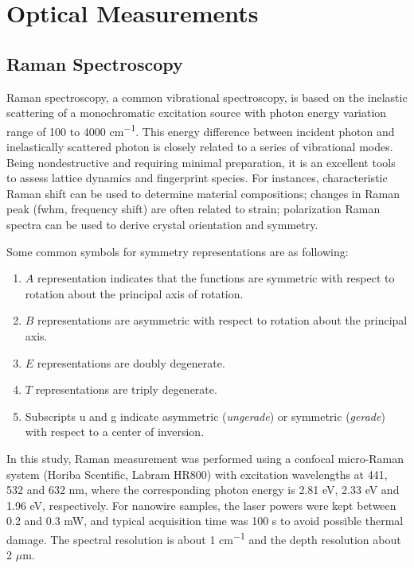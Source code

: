 \section{Optical Measurements}
\subsection{Raman Spectroscopy}

Raman spectroscopy, a common vibrational spectroscopy, is based on the inelastic scattering of a monochromatic excitation source with photon energy variation range of 100 to 4000 \si{cm^{-1}}. This energy difference between incident photon and inelastically scattered photon is closely related to a series of vibrational modes. Being nondestructive and requiring minimal preparation, it is an excellent tools to assess lattice dynamics and fingerprint species.\cite{McCreery2000} For instances, characteristic Raman shift can be used to determine material compositions; changes in Raman peak (\gls{fwhm}, frequency shift) are often related to strain; polarization Raman spectra can be used to derive crystal orientation and symmetry. 

Some common symbols for symmetry representations are as following:
\begin{enumerate}
\item $A$ representation indicates that the functions are symmetric with respect to rotation about the principal axis of rotation.
\item $B$ representations are asymmetric with respect to rotation about the principal axis.
\item $E$ representations are doubly degenerate.
\item $T$ representations are triply degenerate.
\item Subscripts u and g indicate asymmetric (\emph{ungerade}) or symmetric (\emph{gerade}) with respect to a center of inversion.
\end{enumerate}

In this study, Raman measurement was performed using a confocal micro-Raman system (Horiba Scentific, Labram HR800) with excitation wavelengths at 441, 532 and 632 nm, where the corresponding photon energy is 2.81 eV, 2.33 eV and 1.96 eV, respectively. For nanowire samples, the laser powers were kept between 0.2 and 0.3 mW, and typical acquisition time was 100 s to avoid possible thermal damage. The spectral resolution is about 1 \si{cm^{-1}} and the depth resolution about 2 $\mu$m.


